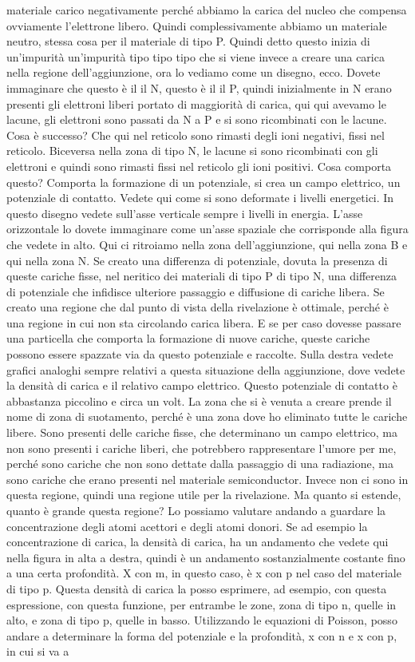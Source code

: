{materiale carico negativamente perché abbiamo la carica del nucleo che compensa ovviamente l'elettrone libero. Quindi complessivamente abbiamo un materiale neutro, stessa cosa per il materiale di tipo P. Quindi detto questo inizia di un'impurità un'impurità tipo tipo tipo che si viene invece a creare una carica nella regione dell'aggiunzione, ora lo vediamo come un disegno, ecco. Dovete immaginare che questo è il il N, questo è il il P, quindi inizialmente in N erano presenti gli elettroni liberi portato di maggiorità di carica, qui qui avevamo le lacune, gli elettroni sono passati da N a P e si sono ricombinati con le lacune. Cosa è successo? Che qui nel reticolo sono rimasti degli ioni negativi, fissi nel reticolo. Biceversa nella zona di tipo N, le lacune si sono ricombinati con gli elettroni e quindi sono rimasti fissi nel reticolo gli ioni positivi. Cosa comporta questo? Comporta la formazione di un potenziale, si crea un campo elettrico, un potenziale di contatto. Vedete qui come si sono deformate i livelli energetici. In questo disegno vedete sull'asse verticale sempre i livelli in energia. L'asse orizzontale lo dovete immaginare come un'asse spaziale che corrisponde alla figura che vedete in alto. Qui ci ritroiamo nella zona dell'aggiunzione, qui nella zona B e qui nella zona N. Se creato una differenza di potenziale, dovuta la presenza di queste cariche fisse, nel neritico dei materiali di tipo P di tipo N, una differenza di potenziale che infidisce ulteriore passaggio e diffusione di cariche libera. Se creato una regione che dal punto di vista della rivelazione è ottimale, perché è una regione in cui non sta circolando carica libera. E se per caso dovesse passare una particella che comporta la formazione di nuove cariche, queste cariche possono essere spazzate via da questo potenziale e raccolte. Sulla destra vedete grafici analoghi sempre relativi a questa situazione della aggiunzione, dove vedete la densità di carica e il relativo campo elettrico. Questo potenziale di contatto è abbastanza piccolino e circa un volt. La zona che si è venuta a creare prende il nome di zona di suotamento, perché è una zona dove ho eliminato tutte le cariche libere. Sono presenti delle cariche fisse, che determinano un campo elettrico, ma non sono presenti i cariche liberi, che potrebbero rappresentare l'umore per me, perché sono cariche che non sono dettate dalla passaggio di una radiazione, ma sono cariche che erano presenti nel materiale semiconductor. Invece non ci sono in questa regione, quindi una regione utile per la rivelazione. Ma quanto si estende, quanto è grande questa regione? Lo possiamo valutare andando a guardare la concentrazione degli atomi acettori e degli atomi donori. Se ad esempio la concentrazione di carica, la densità di carica, ha un andamento che vedete qui nella figura in alta a destra, quindi è un andamento sostanzialmente costante fino a una certa profondità. X con m, in questo caso, è x con p nel caso del materiale di tipo p. Questa densità di carica la posso esprimere, ad esempio, con questa espressione, con questa funzione, per entrambe le zone, zona di tipo n, quelle in alto, e zona di tipo p, quelle in basso. Utilizzando le equazioni di Poisson, posso andare a determinare la forma del potenziale e la profondità, x con n e x con p, in cui si va a }
